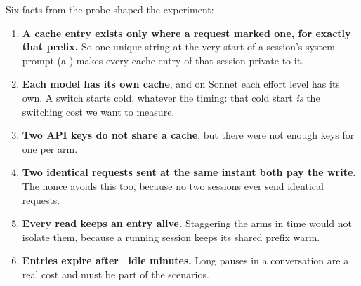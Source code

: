 \begin{keyidea}
Six facts from the probe shaped the experiment:
\begin{enumerate}[leftmargin=1.4em]
  \item \textbf{A cache entry exists only where a request marked one, for exactly that prefix.} So one unique
    string at the very start of a session's system prompt (a ) makes every cache entry of that
    session private to it.
  \item \textbf{Each model has its own cache}, and on Sonnet each effort level has its own. A switch starts
    cold, whatever the timing: that cold start \emph{is} the switching cost we want to measure.
  \item \textbf{Two API keys do not share a cache}, but there were not enough keys for one per arm.
  \item \textbf{Two identical requests sent at the same instant both pay the write.} The nonce avoids this
    too, because no two sessions ever send identical requests.
  \item \textbf{Every read keeps an entry alive.} Staggering the arms in time would not isolate them, because
    a running session keeps its shared prefix warm.
  \item \textbf{Entries expire after \CacheTTLMin\ idle minutes.} Long pauses in a conversation are a
    real cost and must be part of the scenarios.
\end{enumerate}
\end{keyidea}
